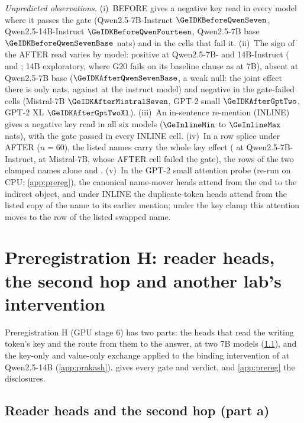 \emph{Unpredicted observations.} (i)~BEFORE gives a negative key read in every model where it passes the gate (Qwen2.5-7B-Instruct $\GeIDKBeforeQwenSeven$, Qwen2.5-14B-Instruct $\GeIDKBeforeQwenFourteen$, Qwen2.5-7B base $\GeIDKBeforeQwenSevenBase$ nats) and in the cells that fail it. (ii)~The sign of the AFTER read varies by model: positive at Qwen2.5-7B- and 14B-Instruct (\GeIDKAfterQwenSeven{} and \GeIDKAfterQwenFourteen{}; 14B exploratory, where G20 fails on its baseline clause as at 7B), absent at Qwen2.5-7B base ($\GeIDKAfterQwenSevenBase$, a weak null: the joint effect there is only \GeIDKVAfterQwenSevenBase{} nats, against \GeIDKVAfterQwenSeven{} at the instruct model) and negative in the gate-failed cells (Mistral-7B $\GeIDKAfterMistralSeven$, GPT-2 small $\GeIDKAfterGptTwo$, GPT-2 XL $\GeIDKAfterGptTwoXl$). (iii)~An in-sentence re-mention (INLINE) gives a negative key read in all six models ($\GeInlineMin$ to $\GeInlineMax$ nats), with the gate passed in every INLINE cell. (iv)~In a row splice under AFTER ($n = 60$), the listed names carry the whole key effect (\GeSpliceOptionsQwenSeven{} at Qwen2.5-7B-Instruct, \GeSpliceOptionsMistralSeven{} at Mistral-7B, whose AFTER cell failed the gate), the rows of the two clamped names alone \GeSpliceOptionsSXQwenSeven{} and \GeSpliceOptionsSXMistralSeven{}. (v)~In the GPT-2 small attention probe (re-run on CPU; \cref{app:prereg}), the canonical name-mover heads attend from the end to the indirect object, and under INLINE the duplicate-token heads attend from the listed copy of the name to its earlier mention; under the key clamp this attention moves to the row of the listed swapped name.

\clearpage
\section{Preregistration H: reader heads, the second hop and another lab's intervention}\label{app:stage6}

Preregistration H (GPU stage 6) has two parts: the heads that read the writing token's key and the route from them to the answer, at two 7B models (\cref{app:heads}), and the key-only and value-only exchange applied to the binding intervention of \citet{prakash2025lookbacks} at Qwen2.5-14B (\cref{app:prakash}).  gives every gate and verdict, and \cref{app:prereg} the disclosures.

\subsection{Reader heads and the second hop (part a)}\label{app:heads}

